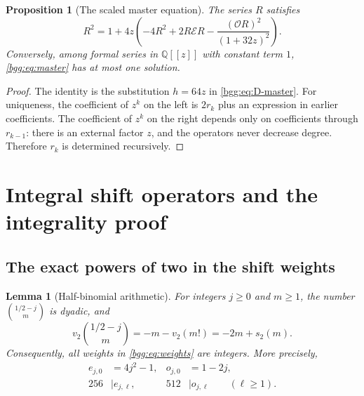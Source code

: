 \documentclass[11pt,a4paper]{article}
\numberwithin{equation}{section}
\newtheorem{lemma}[theorem]{Lemma}
\newtheorem{proposition}[theorem]{Proposition}
\theoremstyle{definition}
\theoremstyle{remark}
\theoremstyle{definition}
\newcommand{\Q}{\mathbb Q}
\newcommand{\Eop}{\mathcal E}
\newcommand{\Oop}{\mathcal O}
\begin{document}
\begin{proposition}[The scaled master equation]\label{bgg:prop:master}
The series $R$ satisfies
\begin{equation}\label{bgg:eq:master}
 \boxed{\displaystyle
 R^2=1+4z\left(-4R^2+2R\Eop R
              -\frac{(\Oop R)^2}{(1+32z)^2}\right).}
\end{equation}
Conversely, among formal series in $\Q[[z]]$ with constant term $1$,
\eqref{bgg:eq:master} has at most one solution.
\end{proposition}

\begin{proof}
The identity is the substitution $h=64z$ in \eqref{bgg:eq:D-master}. For
uniqueness, the coefficient of $z^k$ on the left is $2r_k$ plus an expression
in earlier coefficients. The coefficient of $z^k$ on the right depends only
on coefficients through $r_{k-1}$: there is an external factor $z$, and the
operators never decrease degree. Therefore $r_k$ is determined recursively.
\end{proof}

\section{Integral shift operators and the integrality proof}
\label{bgg:sec:integrality}

\subsection{The exact powers of two in the shift weights}

\begin{lemma}[Half-binomial arithmetic]\label{bgg:lem:half-binomial}
For integers $j\ge0$ and $m\ge1$, the number
$\binom{1/2-j}{m}$ is dyadic, and
\begin{equation}\label{bgg:eq:half-valuation}
 v_2\!\binom{1/2-j}{m}=-m-v_2(m!)=-2m+s_2(m).
\end{equation}
Consequently, all weights in \eqref{bgg:eq:weights} are integers. More precisely,
\begin{align}
 e_{j,0}&=4j^2-1,&o_{j,0}&=1-2j,\label{bgg:eq:diagonal-weights}\\
 256&\mid e_{j,\ell},&512&\mid o_{j,\ell}\qquad(\ell\ge1).
 \label{bgg:eq:offdiagonal-divisibility}
\end{align}
\end{lemma}
\end{document}
